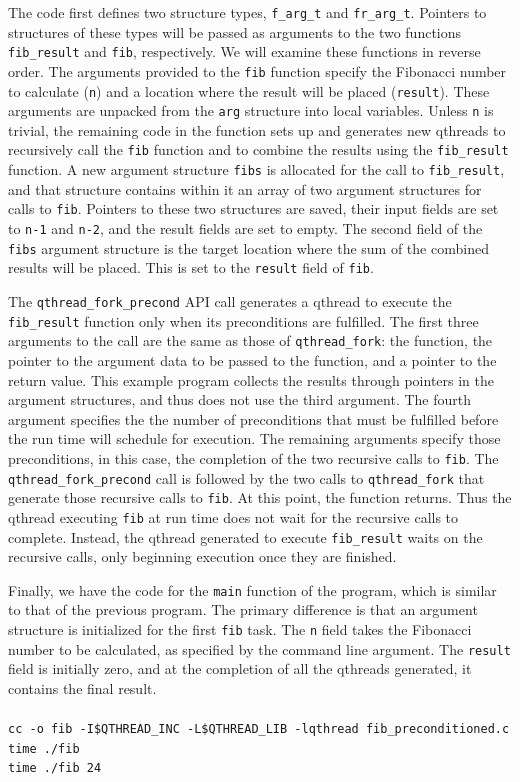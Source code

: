 \documentclass[12pt,fullpage]{article}
\begin{document}
The code first defines two structure types, {\tt f\_arg\_t} and {\tt fr\_arg\_t}.  Pointers to structures of these types will be passed as arguments to the two functions {\tt fib\_result} and {\tt fib}, respectively.  We will examine these functions in reverse order.  The arguments provided to the {\tt fib} function specify the Fibonacci number to calculate ({\tt n}) and a location where the result will be placed ({\tt result}).   These arguments are unpacked from the {\tt arg} structure into local variables.  Unless {\tt n} is trivial, the remaining code in the function sets up and generates new qthreads to recursively call the {\tt fib} function and to combine the results using the {\tt fib\_result} function.  A new argument structure {\tt fibs} is allocated for the call to {\tt fib\_result}, and that structure contains within it an array of two argument structures for calls to {\tt fib}.  Pointers to these two structures are saved, their input fields are set to {\tt n-1} and {\tt n-2}, and the result fields are set to empty.  The second field of the {\tt fibs} argument structure is the target location where the sum of the combined results will be placed.  This is set to the {\tt result} field of {\tt fib}.

The {\tt qthread\_fork\_precond} API call generates a qthread to execute the {\tt fib\_result} function only when its preconditions are fulfilled.  The first three arguments to the call are the same as those of {\tt qthread\_fork}: the function, the pointer to the argument data to be passed to the function, and a pointer to the return value.  This example program collects the results through pointers in the argument structures, and thus does not use the third argument.  The fourth argument specifies the the number of preconditions that must be fulfilled before the run time will schedule for execution.  The remaining arguments specify those preconditions, in this case, the completion of the two recursive calls to {\tt fib}.  The {\tt qthread\_fork\_precond} call is followed by the two calls to {\tt qthread\_fork} that generate those recursive calls to {\tt fib}.  At this point, the function returns.  Thus the qthread executing {\tt fib} at run time does not wait for the recursive calls to complete.  Instead, the qthread generated to execute {\tt fib\_result} waits on the recursive calls, only beginning execution once they are finished.

Finally, we have the code for the {\tt main} function of the program, which is similar to that of the previous program.  The primary difference is that an argument structure is initialized for the first {\tt fib} task.  The {\tt n} field takes the Fibonacci number to be calculated, as specified by the command line argument.  The {\tt result} field is initially zero, and at the completion of all the qthreads generated, it contains the final result.
\\ \\
{\footnotesize{\tt cc -o fib -I\$QTHREAD\_INC -L\$QTHREAD\_LIB -lqthread fib\_preconditioned.c}}
\\
{\footnotesize{\tt time ./fib}}
\\
{\footnotesize{\tt time ./fib 24}}
\newpage

\end{document}

